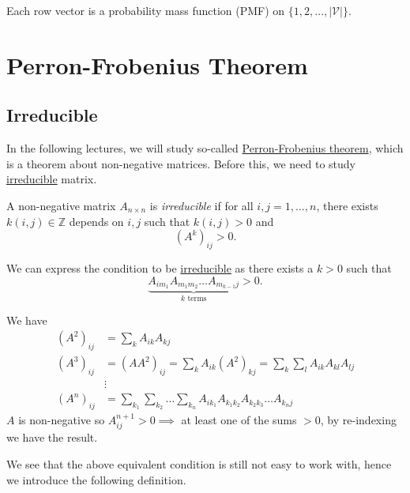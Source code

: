 \begin{remark}
	Each row vector is a probability mass function (PMF) on \(\{1, 2, \ldots , \left\vert \mathcal{V}  \right\vert \}\).
\end{remark}

\section{Perron-Frobenius Theorem}
\subsection{Irreducible}
In the following lectures, we will study so-called \hyperref[thm:Perron-Frobenius-theorem]{Perron-Frobenius theorem}, which is a theorem about non-negative matrices. Before this, we need to study \hyperref[def:irreducible]{irreducible} matrix.

\begin{definition}[Irreducible]\label{def:irreducible}
	A non-negative matrix \(A_{n\times n}\) is \emph{irreducible} if for all \(i, j = 1, \ldots , n\), there exists \(k(i, j)\in \mathbb{Z} \)
	depends on \(i, j\) such that \(k(i, j) > 0\) and
	\[
		(A^k)_{ij}>0.
	\]
\end{definition}

\begin{remark}
	We can express the condition to be \hyperref[def:irreducible]{irreducible} as there exists a \(k > 0\) such that
	\[
		\underbrace{A_{im_1} A_{m_{1}m_2} \ldots A_{m_{k-1}j}}_{k\text{ terms}}>0.
	\]
\end{remark}
\begin{explanation}
	We have
	\[
		\begin{split}
			(A^2)_{ij} &= \sum\limits_{k} A_{ik}A_{kj}\\
			(A^3)_{ij} &= (A A^2)_{ij} = \sum\limits_{k} A_{ik}(A^2)_{kj} = \sum\limits_{k}\sum\limits_{l} A_{ik} A_{kl}A_{lj}\\
			&\vdots\\
			(A^n)_{ij} &= \sum\limits_{k_1}\sum\limits_{k_2}\ldots \sum\limits_{k_n}A_{ik_1}A_{k_1 k_2}A_{k_2 k_3}\ldots A_{k_n j}
		\end{split}
	\]
	\(A\) is non-negative so \(A^{n+1}_{ij} > 0\implies \) at least one of the sums \(>0\), by re-indexing we have the result.
\end{explanation}

We see that the above equivalent condition is still not easy to work with, hence we introduce the following definition.

